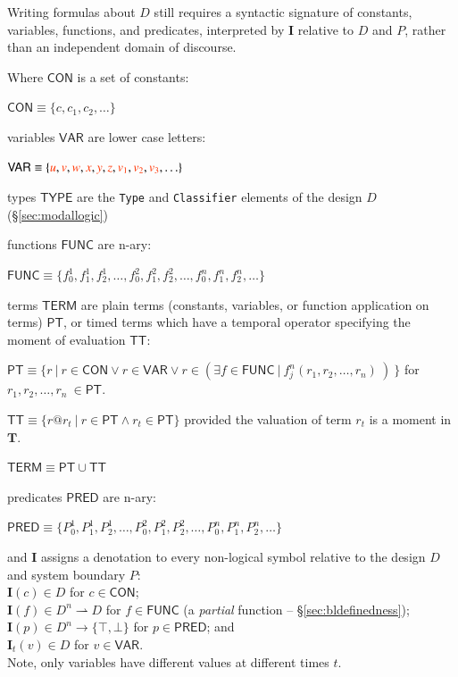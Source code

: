 \pn Writing formulas about $D$ still requires a syntactic signature of constants, variables, functions, and predicates, interpreted by $\mathbf{I}$ relative to $D$ and $P$, rather than an independent domain of discourse.

 Where $\mathsf{CON}$ is a set of constants:

 \( \mathsf{CON} \equiv \{ c, c_1, c_2, \ldots \} \)

 variables $\mathsf{VAR}$ are lower case letters:

 \( \mathsf{VAR} \equiv \{ \msc{u}, \msc{v}, \msc{w}, \msc{x}, \msc{y}, \msc{z}, \msc{v_1}, \msc{v_2}, \msc{v_3}, \ldots \} \)

 types $\mathsf{TYPE}$ are the \texttt{Type} and \texttt{Classifier} elements of the design $D$ (\S\ref{sec:modallogic})

 functions $\mathsf{FUNC}$ are n-ary:
 
 \( \mathsf{FUNC} \equiv \{ f^1_0, f^1_1, f^1_2, \ldots, f^2_0, f^2_1, f^2_2, \ldots, f^n_0, f^n_1, f^n_2, \ldots \} \) 
 
 terms $\mathsf{TERM}$ are plain terms (constants, variables, or function application on terms) $\mathsf{PT}$, or timed terms which have a temporal operator specifying the moment of evaluation $\mathsf{TT}$:
 
 \( \mathsf{PT} \equiv \{ r~\vert~r \in  \mathsf{CON} \vee r \in  \mathsf{VAR} \vee r \in ( \exists f \in \mathsf{FUNC}~\vert~ f^n_j(r_1,r_2,\ldots,r_n)~)~\} \) for $r_1,r_2,\ldots,r_n~\in \mathsf{PT}$.
 
 \( \mathsf{TT} \equiv \{ r@r_t~\vert~r \in  \mathsf{PT} \wedge r_t \in \mathsf{PT} \} \) provided the valuation of term $r_t$ is a moment in $\mathbf{T}$.
 
  \( \mathsf{TERM} \equiv \mathsf{PT} \cup \mathsf{TT}  \)
 
 predicates $ \mathsf{PRED}$ are n-ary:
 
 \( \mathsf{PRED} \equiv \{ P^1_0, P^1_1, P^1_2, \ldots, P^2_0, P^2_1, P^2_2, \ldots, P^n_0, P^n_1, P^n_2, \ldots \} \)

 and $\mathbf{I}$ assigns a denotation to every non-logical symbol relative to the design $D$ and system boundary $P$:\\
 $\mathbf{I}(c) \in D$ for $c \in \mathsf{CON}$;\\
 $\mathbf{I}(f) \in D^n \rightharpoonup D$ for $f \in \mathsf{FUNC}$ (a \emph{partial} function -- \S\ref{sec:bldefinedness});\\
 $\mathbf{I}(p) \in D^n \rightarrow \{\top,\bot\}$ for $p \in \mathsf{PRED}$; and \\
 $\mathbf{I}_{t}(v) \in D$ for $v \in \mathsf{VAR}$.\\
 Note, only variables have different values at different times $t$.
 
